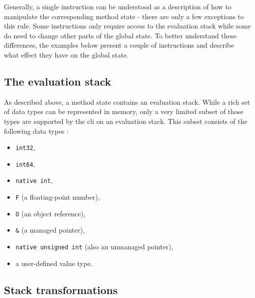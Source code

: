 \documentclass{article}
\numberwithin{equation}{section}
\begin{document}
Generally, a single instruction can be understood as a description of how to manipulate the corresponding method state - there are only a few exceptions to this rule. Some instructions only require access to the evaluation stack while some do need to change other parts of the global state. To better understand these differences, the examples below present a couple of instructions and describe what effect they have on the global state.

\subsection{The evaluation stack}

As described above, a method state contains an evaluation stack. While a rich set of data types can be represented in memory, only a very limited subset of those types are supported by the \acrshort{cli} on an evaluation stack. This subset consists of the following data types \cite{ecmaStandard}:
\begin{itemize}
	\item{\texttt{int32},}
	\item{\texttt{int64},}
	\item{\texttt{native int},}
	\item{\texttt{F} (a floating-point number),}
	\item{\texttt{O} (an object reference),}
	\item{\texttt{\&} (a managed pointer),}
	\item{\texttt{native unsigned int} (also an unmanaged pointer),}
	\item{a user-defined value type.}
\end{itemize}

\subsection{Stack transformations}
\label{sec:stackTransformations}
\end{document}
